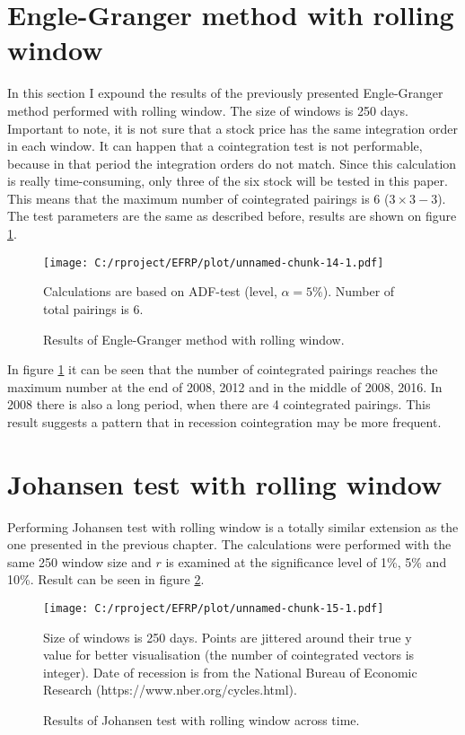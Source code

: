 \documentclass[12pt, a4paper, twoside, titlepage]{article}
\begin{document}
\section{Engle-Granger method with rolling window}
\fancyhead[LE,RO]{}

In this section I expound the results of the previously presented Engle-Granger method performed with rolling window. The size of windows is 250 days. Important to note, it is not sure that a stock price has the same integration order in each window. It can happen that a cointegration test is not performable, because in that period the integration orders do not match. Since this calculation is really time-consuming, only three of the six stock will be tested in this paper. This means that the maximum number of cointegrated pairings is 6 ($3 \times 3 - 3$). The test parameters are the same as described before, results are shown on figure \ref{fig6}.

\begin{figure}[ht]
  \centering
  \texttt{[image: C:/rproject/EFRP/plot/unnamed-chunk-14-1.pdf]}
  \caption{Results of Engle-Granger method with rolling window.}
  \label{fig6}
  Calculations are based on ADF-test (level, $\alpha = 5\%$). Number of total pairings is 6.
\end{figure}

In figure \ref{fig6} it can be seen that the number of cointegrated pairings reaches the maximum number at the end of 2008, 2012 and in the middle of 2008, 2016. In 2008 there is also a long period, when there are 4 cointegrated pairings. This result suggests a pattern that in recession cointegration may be more frequent.

\section{Johansen test with rolling window}


Performing Johansen test with rolling window is a totally similar extension as the one presented in the previous chapter. The calculations were performed with the same 250 window size and $r$ is examined at the significance level of 1\%, 5\% and 10\%. Result can be seen in figure \ref{fig7}.

\begin{figure}[ht]
  \centering
  \texttt{[image: C:/rproject/EFRP/plot/unnamed-chunk-15-1.pdf]}
  \caption{Results of Johansen test with rolling window across time.}
  \label{fig7}
  
  Size of windows is 250 days. Points are jittered around their true y value for better visualisation (the number of cointegrated vectors is integer). Date of recession is from the National Bureau of Economic Research (https://www.nber.org/cycles.html).
\end{figure}
\end{document}
